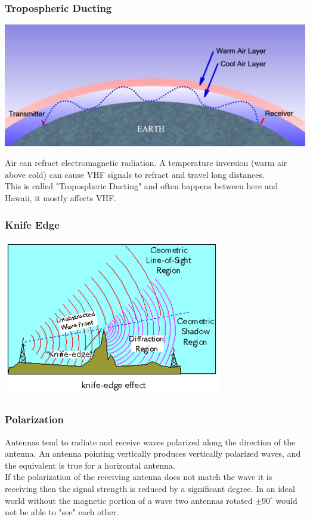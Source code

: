 \documentclass[10pt]{beamer}
\begin{document}
\begin{frame}
\frametitle{Tropospheric Ducting}
\begin{center}
\includegraphics[width=\textwidth]{troposhpere.png}
\end{center}
Air can refract electromagnetic radiation. A temperature inversion (warm air above cold) can cause VHF signals to refract and travel long distances.\\
This is called "Tropospheric Ducting" and often happens between here and Hawaii, it mostly affects VHF.
\end{frame}

\begin{frame}
\frametitle{Knife Edge}
\begin{center}
\includegraphics[height=.9\textheight]{knifeedge.png}
\end{center}
\end{frame}

\begin{frame}
\frametitle{Polarization}
Antennas tend to radiate and receive waves polarized along the direction of the antenna. An antenna pointing vertically produces vertically polarized waves, and the equivalent is true for a horizontal antenna.\\
If the polarization of the receiving antenna does not match the wave it is receiving then the signal strength is reduced by a significant degree. In an ideal world without the magnetic portion of a wave two antennas rotated $\pm90^{\circ}$ would not be able to "see" each other.
\end{frame}
\end{document}
